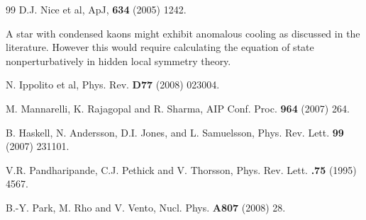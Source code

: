 \documentclass[aps,twocolumn,preprintnumbers,%
superscriptaddress,floatfix]{revtex4}
\begin{document}
\begin{thebibliography}{99}
  D.J. Nice et al,  ApJ, {\bf 634} (2005) 1242.



 A star with condensed kaons might exhibit
anomalous cooling as discussed in the literature. However this would
require calculating the equation of state nonperturbatively in
hidden local symmetry theory.

 N. Ippolito et al, Phys. Rev. {\bf D77} (2008) 023004.

 M. Mannarelli, K. Rajagopal and R. Sharma,  AIP Conf. Proc. {\bf 964} (2007) 264.

 B. Haskell, N.  Andersson, D.I.  Jones,  and L. Samuelsson,  Phys. Rev. Lett.  {\bf 99} (2007)  231101.

 V.R. Pandharipande, C.J.  Pethick and  V. Thorsson,  Phys. Rev. Lett.  {\bf .75} (1995)  4567.

 B.-Y. Park, M. Rho and V. Vento, Nucl. Phys. {\bf A807} (2008) 28.




\end{thebibliography}
\end{document}
